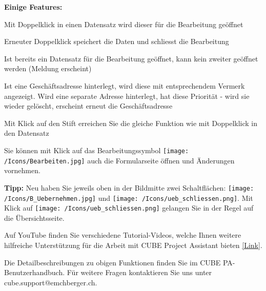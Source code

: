 \textbf{Einige Features:}
\begin{compactitem}
	\item Mit Doppelklick in einen Datensatz wird dieser für die Bearbeitung geöffnet
	\item Erneuter Doppelklick speichert die Daten und schliesst die Bearbeitung
	\item Ist bereits ein Datensatz für die Bearbeitung geöffnet, kann kein zweiter geöffnet werden (Meldung erscheint)
	\item Ist eine Geschäftsadresse hinterlegt, wird diese mit entsprechendem Vermerk angezeigt. Wird eine separate Adresse hinterlegt, hat diese Priorität - wird sie wieder gelöscht, erscheint erneut die Geschäftsadresse
	\item Mit Klick auf den Stift erreichen Sie die gleiche Funktion wie mit Doppelklick in den Datensatz
	\item Sie können mit Klick auf das Bearbeitungssymbol \texttt{[image: /Icons/Bearbeiten.jpg]} auch die Formularseite öffnen und Änderungen vornehmen.
\end{compactitem}

\vspace{\baselineskip}

\textbf{Tipp:} Neu haben Sie jeweils oben in der Bildmitte zwei Schaltflächen: \texttt{[image: /Icons/B\_Uebernehmen.jpg]} und \texttt{[image: /Icons/ueb\_schliessen.png]}. Mit Klick auf \texttt{[image: /Icons/ueb\_schliessen.png]} gelangen Sie in der Regel auf die Übersichtsseite.

\vspace{\baselineskip}

Auf YouTube finden Sie verschiedene Tutorial-Videos, welche Ihnen weitere hilfreiche Unterstützung für die Arbeit mit CUBE Project Assistant bieten \href{https://www.youtube.com/channel/UCYWA8nERo4vTPYWP0WJ32hw}{\color{blue}[Link]}.

\vspace{\baselineskip}

Die Detailbeschreibungen zu obigen Funktionen finden Sie im CUBE PA-Benutzerhandbuch. Für weitere Fragen kontaktieren Sie uns unter {\color{red} cube.support@emchberger.ch}.
